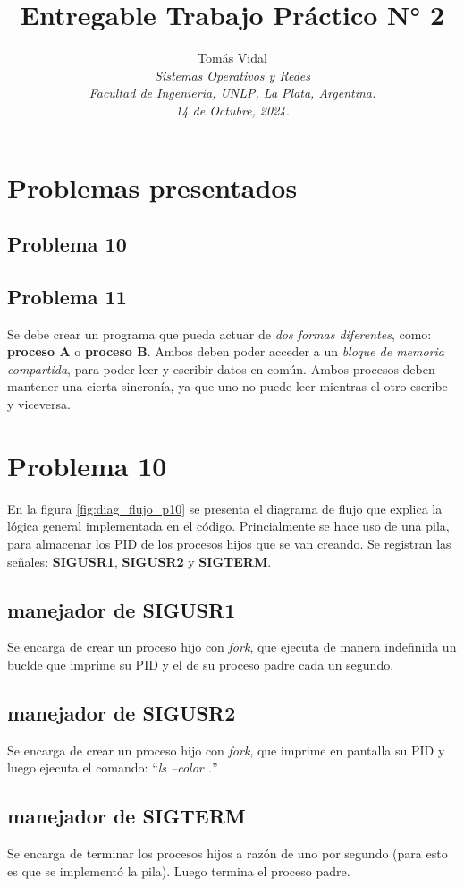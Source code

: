 \documentclass[letterpaper, 10 pt, conference]{ieeeconf}  %
\title{\LARGE \bf Entregable Trabajo Práctico N° 2}
\author{
  Tom\'as Vidal\\
  {\it Sistemas Operativos y Redes}\\
  {\it Facultad de Ingenier\'ia, UNLP, La Plata, Argentina.}\\
  {\it 14 de Octubre, 2024.}
}                                            %
\begin{document}
\maketitle
\thispagestyle{empty}
\pagestyle{empty}

\section{Problemas presentados}
\subsection{Problema 10}

\subsection{Problema 11}
Se debe crear un programa que pueda actuar de \textit{dos formas diferentes}, como: \textbf{proceso A} o \textbf{proceso B}. Ambos deben poder acceder a un \textit{bloque de memoria compartida}, para poder leer y escribir datos en común. Ambos procesos deben mantener una cierta sincronía, ya que uno no puede leer mientras el otro escribe y viceversa.

\section{Problema 10}
En la figura \ref{fig:diag_flujo_p10} se presenta el diagrama de flujo que explica la lógica general implementada en el código. Princialmente se hace uso de una pila, para almacenar los PID de los procesos hijos que se van creando. Se registran las señales: \textbf{SIGUSR1}, \textbf{SIGUSR2} y \textbf{SIGTERM}.
\subsection{manejador de SIGUSR1}
Se encarga de crear un proceso hijo con \textit{fork}, que ejecuta de manera indefinida un buclde que imprime su PID y el de su proceso padre cada un segundo.
\subsection{manejador de SIGUSR2}
Se encarga de crear un proceso hijo con \textit{fork}, que imprime en pantalla su PID y luego ejecuta el comando: ``\textit{ls --color .}''
\subsection{manejador de SIGTERM}
Se encarga de terminar los procesos hijos a razón de uno por segundo (para esto es que se implementó la pila). Luego termina el proceso padre.
\end{document}
